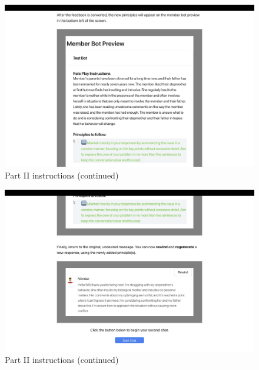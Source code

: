 \documentclass[11pt]{article}
\begin{document}
\begin{figure}[ht]
    \centering
    \includegraphics[width=\textwidth]{Study Screenshots/Screen7.jpeg}
    \caption{Part II instructions (continued)}
    \label{fig:screen7}
\end{figure}

\begin{figure}[ht]
    \centering
    \includegraphics[width=\textwidth]{Study Screenshots/Screen8.jpeg}
    \caption{Part II instructions (continued)}
    \label{fig:screen8}
\end{figure}
\end{document}
